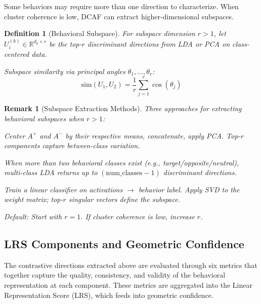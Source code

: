 \documentclass[11pt]{article}
\newtheorem{definition}{Definition}[section]
\newtheorem{remark}{Remark}[section]
\begin{document}
Some behaviors may require more than one direction to characterize. When cluster coherence is low, DCAF can extract higher-dimensional subspaces.

\begin{definition}[Behavioral Subspace]
\label{def:behavioral-subspace}
For subspace dimension $r > 1$, let $U^{(k)}_i \in \mathbb{R}^{d_k \times r}$ be the top-$r$ discriminant directions from LDA or PCA on class-centered data.

Subspace similarity via principal angles $\theta_1, \ldots, \theta_r$:
\begin{equation}
\text{sim}(U_1, U_2) = \frac{1}{r} \sum_{j=1}^r \cos(\theta_j)
\end{equation}
\end{definition}

\begin{remark}[Subspace Extraction Methods]
\label{rem:subspace-extraction-methods}
Three approaches for extracting behavioral subspaces when $r > 1$:
\begin{description}[nosep, leftmargin=1em]
\item[Method 1 (PCA on class-centered data):] Center $A^+$ and $A^-$ by their respective means, concatenate, apply PCA. Top-$r$ components capture between-class variation.
\item[Method 2 (Multi-class LDA):] When more than two behavioral classes exist (e.g., target/opposite/neutral), multi-class LDA returns up to $(\text{num\_classes} - 1)$ discriminant directions.
\item[Method 3 (Linear probe weights):] Train a linear classifier on activations $\to$ behavior label. Apply SVD to the weight matrix; top-$r$ singular vectors define the subspace.
\end{description}
Default: Start with $r=1$. If cluster coherence is low, increase $r$.
\end{remark}

\subsection{LRS Components and Geometric Confidence}

The contrastive directions extracted above are evaluated through six metrics that together capture the quality, consistency, and validity of the behavioral representation at each component. These metrics are aggregated into the Linear Representation Score (LRS), which feeds into geometric confidence.
\end{document}
